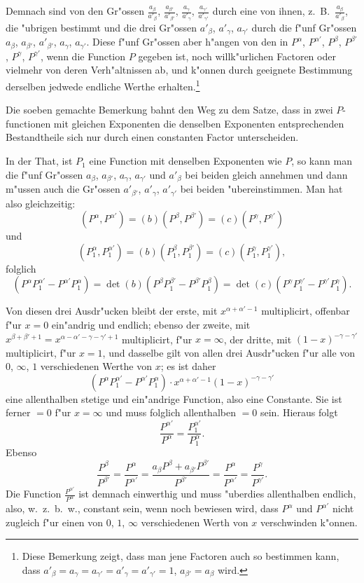 \documentclass[12pt,a4paper]{book}
\theoremstyle{definition}
\theoremstyle{remark}
\begin{document}
Demnach sind von den Gr{"o}ssen $\frac{a_{\beta}}{a'_{\beta}}$, $\frac{a_{\beta'}}{a'_{\beta'}}$, $\frac{a_{\gamma}}{a'_{\gamma}}$, $\frac{a_{\gamma'}}{a'_{\gamma'}}$ durch eine von ihnen, z.~B.\ $\frac{a_{\beta}}{a'_{\beta}}$, die {"u}brigen bestimmt und die drei Gr{"o}ssen $a'_{\beta}$, $a'_{\gamma}$, $a_{\gamma'}$ durch die f{"u}nf Gr{"o}ssen $a_{\beta}$, $a_{\beta'}$, $a'_{\beta'}$, $a_{\gamma}$, $a_{\gamma'}$. Diese f{"u}nf Gr{"o}ssen aber h{"a}ngen von den in $P^{\alpha}$, $P^{\alpha'}$, $P^{\beta}$, $P^{\beta'}$, $P^{\gamma}$, $P^{\gamma'}$, wenn die Function $P$ gegeben ist, noch willk{"u}rlichen Factoren oder vielmehr von deren Verh{"a}ltnissen ab, und k{"o}nnen durch geeignete Bestimmung derselben jedwede endliche Werthe erhalten.\footnote{Diese Bemerkung zeigt, dass man jene Factoren auch so bestimmen kann, dass $a'_{\beta} = a_{\gamma} = a_{\gamma'} = a'_{\gamma} = a'_{\gamma'} = 1$, $a_{\beta'} = a_{\beta}$ wird.}

Die soeben gemachte Bemerkung bahnt den Weg zu dem Satze, dass in zwei $P$-functionen mit gleichen Exponenten die denselben Exponenten entsprechenden Bestandtheile sich nur durch einen constanten Factor unterscheiden.

In der That, ist $P_1$ eine Function mit denselben Exponenten wie $P$, so kann man die f{"u}nf Gr{"o}ssen $a_{\beta}$, $a_{\beta'}$, $a_{\gamma}$, $a_{\gamma'}$ und $a'_{\beta}$ bei beiden gleich annehmen und dann m{"u}ssen auch die Gr{"o}ssen $a'_{\beta'}$, $a'_{\gamma}$, $a'_{\gamma'}$ bei beiden {"u}bereinstimmen. Man hat also gleichzeitig:
\[
(P^{\alpha}, P^{\alpha'}) = (b)(P^{\beta}, P^{\beta'}) = (c)(P^{\gamma}, P^{\gamma'})
\]
und
\[
(P_1^{\alpha}, P_1^{\alpha'}) = (b)(P_1^{\beta}, P_1^{\beta'}) = (c)(P_1^{\gamma}, P_1^{\gamma'}),
\]
folglich
\[
(P^{\alpha} P_1^{\alpha'} - P^{\alpha'} P_1^{\alpha}) = \det(b)(P^{\beta} P_1^{\beta'} - P^{\beta'} P_1^{\beta}) = \det(c)(P^{\gamma} P_1^{\gamma'} - P^{\gamma'} P_1^{\gamma}).
\]

Von diesen drei Ausdr{"u}cken bleibt der erste, mit $x^{\alpha+\alpha'-1}$ multiplicirt, offenbar f{"u}r $x = 0$ ein{"a}ndrig und endlich; ebenso der zweite, mit $x^{\beta+\beta'+1} = x^{\alpha-\alpha'-\gamma-\gamma'+1}$ multiplicirt, f{"u}r $x = \infty$, der dritte, mit $(1-x)^{-\gamma-\gamma'}$ multiplicirt, f{"u}r $x = 1$, und dasselbe gilt von allen drei Ausdr{"u}cken f{"u}r alle von $0$, $\infty$, $1$ verschiedenen Werthe von $x$; es ist daher
\[
(P^{\alpha} P_1^{\alpha'} - P^{\alpha'} P_1^{\alpha}) \cdot x^{\alpha+\alpha'-1} (1-x)^{-\gamma-\gamma'}
\]
eine allenthalben stetige und ein{"a}ndrige Function, also eine Constante. Sie ist ferner $= 0$ f{"u}r $x = \infty$ und muss folglich allenthalben $= 0$ sein. Hieraus folgt
\[
\frac{P^{\alpha'}}{P^{\alpha}} = \frac{P_1^{\alpha'}}{P_1^{\alpha}}.
\]
Ebenso
\[
\frac{P^{\beta}}{P^{\beta'}} = \frac{P^{\alpha}}{P^{\alpha'}} = \frac{a_{\beta} P^{\beta} + a_{\beta'} P^{\beta'}}{P^{\beta'}} = \frac{P^{\alpha}}{P^{\alpha'}} = \frac{P^{\gamma}}{P^{\gamma'}}.
\]
Die Function $\frac{P^{\alpha'}}{P^{\alpha}}$ ist demnach einwerthig und muss {"u}berdies allenthalben endlich, also, w.~z.~b.~w., constant sein, wenn noch bewiesen wird, dass $P^{\alpha}$ und $P^{\alpha'}$ nicht zugleich f{"u}r einen von $0$, $1$, $\infty$ verschiedenen Werth von $x$ verschwinden k{"o}nnen.
\end{document}
